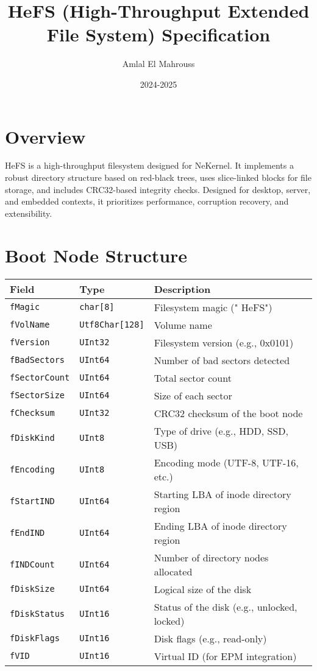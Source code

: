 \documentclass{article}
\title{HeFS (High-Throughput Extended File System) Specification}
\author{Amlal El Mahrouss}
\date{2024-2025}
\begin{document}
\maketitle

\section{Overview}
HeFS is a high-throughput filesystem designed for NeKernel. It implements a robust directory structure based on red-black trees, uses slice-linked blocks for file storage, and includes CRC32-based integrity checks. Designed for desktop, server, and embedded contexts, it prioritizes performance, corruption recovery, and extensibility.

\section{Boot Node Structure}
\begin{longtable}{|l|l|p{8cm}|}
\hline
\textbf{Field} & \textbf{Type} & \textbf{Description} \\
\hline
\verb|fMagic| & \verb|char[8]| & Filesystem magic ("  HeFS") \\
\verb|fVolName| & \verb|Utf8Char[128]| & Volume name \\
\verb|fVersion| & \verb|UInt32| & Filesystem version (e.g., 0x0101) \\
\verb|fBadSectors| & \verb|UInt64| & Number of bad sectors detected \\
\verb|fSectorCount| & \verb|UInt64| & Total sector count \\
\verb|fSectorSize| & \verb|UInt64| & Size of each sector \\
\verb|fChecksum| & \verb|UInt32| & CRC32 checksum of the boot node \\
\verb|fDiskKind| & \verb|UInt8| & Type of drive (e.g., HDD, SSD, USB) \\
\verb|fEncoding| & \verb|UInt8| & Encoding mode (UTF-8, UTF-16, etc.) \\
\verb|fStartIND| & \verb|UInt64| & Starting LBA of inode directory region \\
\verb|fEndIND| & \verb|UInt64| & Ending LBA of inode directory region \\
\verb|fINDCount| & \verb|UInt64| & Number of directory nodes allocated \\
\verb|fDiskSize| & \verb|UInt64| & Logical size of the disk \\
\verb|fDiskStatus| & \verb|UInt16| & Status of the disk (e.g., unlocked, locked) \\
\verb|fDiskFlags| & \verb|UInt16| & Disk flags (e.g., read-only) \\
\verb|fVID| & \verb|UInt16| & Virtual ID (for EPM integration) \\
\hline
\end{longtable}
\end{document}
